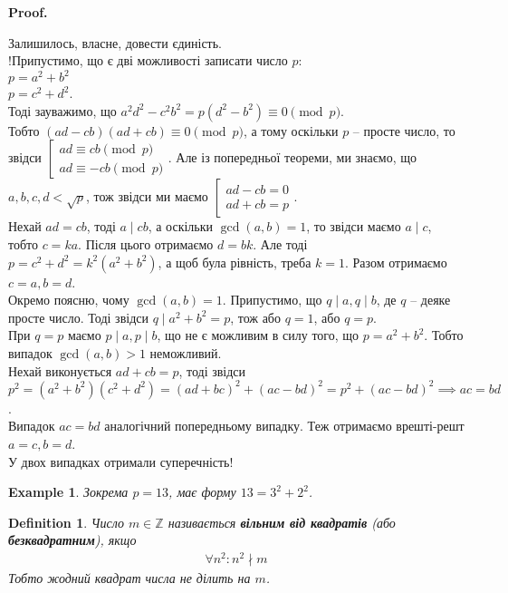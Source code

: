 \documentclass[a4paper, 14pt]{extarticle}
\makeatletter
\theoremstyle{theoremdd}
\theoremstyle{theoremdd}
\newtheorem{definition}[theorem]{Definition}
\theoremstyle{theoremdd}
\theoremstyle{theoremdd}
\newtheorem{example}[theorem]{Example}
\theoremstyle{theoremdd}
\theoremstyle{theoremdd}
\theoremstyle{theoremdd}
\theoremstyle{theoremdd}
\def\qed{$\blacksquare$}
\renewenvironment{proof}[1][Proof.\\]{\par
\pushQED{\hfill \qed}%
\normalfont \topsep6\p@\@plus6\p@\relax
\trivlist
\item\relax
{\bfseries
#1\@addpunct{.}}\hspace\labelsep\ignorespaces
}{%
\popQED\endtrivlist\@endpefalse
}
\makeatother
\begin{document}
\begin{proof}
Залишилось, власне, довести єдиність.\\
!Припустимо, що є дві можливості записати число $p$:\\
$p = a^2+b^2$\\
$p = c^2+d^2$.\\
Тоді зауважимо, що $a^2d^2-c^2b^2 = p(d^2-b^2) \equiv 0 \pmod p$.\\
Тобто $(ad-cb)(ad+cb) \equiv 0 \pmod p$, а тому оскільки $p$ -- просте число, то звідси $\left[ \begin{gathered} ad \equiv cb \pmod p \\ ad \equiv -cb \pmod p \end{gathered} \right.$. Але із попередньої теореми, ми знаємо, що $a,b,c,d < \sqrt{p}$, тож звідси ми маємо $\left[ \begin{gathered} ad - cb = 0 \\ ad + cb = p \end{gathered} \right.$.\\
Нехай $ad = cb$, тоді $a \mid cb$, а оскільки $\gcd(a,b) = 1$, то звідси маємо $a \mid c$, тобто $c = ka$. Після цього отримаємо $d = bk$. Але тоді\\
$p = c^2+d^2 = k^2(a^2+b^2)$, а щоб була рівність, треба $k = 1$. Разом отримаємо $c = a, b = d$.\\
Окремо поясню, чому $\gcd(a,b) = 1$. Припустимо, що $q \mid a, q \mid b$, де $q$ -- деяке просте число. Тоді звідси $q \mid a^2+b^2 = p$, тож або $q = 1$, або $q = p$.\\
При $q = p$ маємо $p \mid a, p \mid b$, що не є можливим в силу того, що $p = a^2+b^2$. Тобто випадок $\gcd(a,b) > 1$ неможливий.\\
Нехай виконується $ad+cb = p$, тоді звідси \\
$p^2 = (a^2+b^2)(c^2+d^2) = (ad+bc)^2+(ac-bd)^2 = p^2+(ac-bd)^2 \implies ac = bd$.\\
Випадок $ac = bd$ аналогічний попередньому випадку. Теж отримаємо врешті-решт $a = c, b = d$.\\
У двох випадках отримали суперечність!
\end{proof}

\begin{example}
Зокрема $p = 13$, має форму $13 = 3^2+2^2$.
\end{example}

\begin{definition}
\label{square_free}
Число $m \in \mathbb{Z}$ називається \textbf{вільним від квадратів} (або \textbf{безквадратним}), якщо
\begin{align*}
\forall n^2: n^2 \nmid m
\end{align*}
Тобто жодний квадрат числа не ділить на $m$.
\end{definition}
\end{document}
